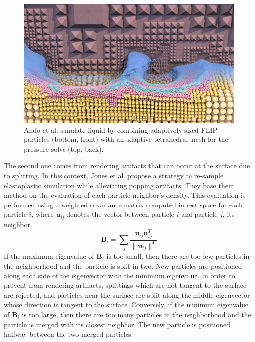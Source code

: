 \begin{figure}[t]
\centering
\includegraphics[width=0.8\linewidth]{images/starAdaptivity-cgf2016/Ando2013_3.png}
\caption[STAR adaptivity: Hybrid refinement of meshes and particles]{Ando et al. \cite{Ando2013} simulate liquid by combining adaptively-sized FLIP particles (bottom, front) with an adaptive tetrahedral mesh for the pressure solve (top, back).}
\label{fig:Ando2013}
\end{figure}

The second one comes from rendering artifacts that can occur at the surface due to splitting. In this context, Jones et al. \cite{Jones:2014:DEF} propose a strategy to re-sample elastoplastic simulation while alleviating popping artifacts. They base their method on the evaluation of each particle neighbor's density. This evaluation is performed using a weighted covariance matrix computed in rest space for each particle $i$, where $\mathbf{u}_{ij}$ denotes the vector between particle $i$ and particle $j$, its neighbor.
\begin{equation}
\label{eq:jones_re-sampling}
\mathbf{B}_{i} = \sum_{j}  \frac{\mathbf{u}_{ij}\mathbf{u}_{ij}^{T}}{\| \mathbf{u}_{ij} \|^{4}}
\end{equation}
If the maximum eigenvalue of $\mathbf{B}_{i}$ is too small, then there are too few particles in the neighborhood and the particle is split in two. New particles are positioned along each side of the eigenvector with the minimum eigenvalue. In order to prevent from rendering artifacts, splittings which are not tangent to the surface are rejected, and particles near the surface are split along the middle eigenvector whose direction is tangent to the surface. Conversely, if the minimum eigenvalue of $\mathbf{B}_{i}$ is too large, then there are too many particles in the neighborhood and the particle is merged with its closest neighbor. The new particle is positioned halfway between the two merged particles.

